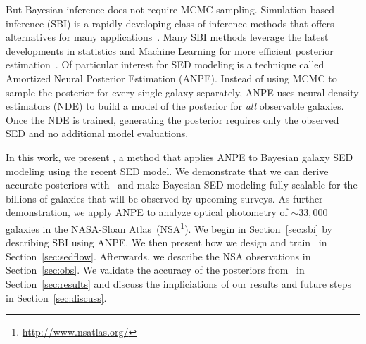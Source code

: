 But Bayesian inference does not require MCMC sampling. 
Simulation-based inference (SBI)
is a rapidly developing class of inference methods that offers alternatives for
many applications~\citep[see][and references therein]{cranmer2020}.
Many SBI methods leverage the latest developments in statistics and Machine
Learning for more efficient posterior estimation~\citep{papamakarios2017,
alsing2019a, hahn2019c, dax2021, huppenkothen2021, zhang2021}. 
Of particular interest for SED modeling is a technique called Amortized
Neural Posterior Estimation (ANPE). 
Instead of using MCMC to sample the posterior for every single galaxy separately,
ANPE uses neural density estimators (NDE) to build a model of the posterior for 
\emph{all} observable galaxies.
Once the NDE is trained, generating the posterior requires only the observed SED and no additional model
evaluations.
%

In this work, we present \sedflow, a method that applies ANPE to Bayesian
galaxy SED modeling using the recent \cite{hahn2022} SED model. 
We demonstrate that we can derive accurate posteriors with \sedflow~and make
Bayesian SED modeling fully scalable for the billions of galaxies that will be
observed by upcoming surveys.
As further demonstration, we apply ANPE to analyze optical photometry of
${\sim}33,000$ galaxies in the NASA-Sloan
Atlas~(NSA\footnote{\url{http://www.nsatlas.org/}}). 
We begin in Section~\ref{sec:sbi} by describing SBI using ANPE.
We then present how we design and train \sedflow~in Section~\ref{sec:sedflow}.
Afterwards, we describe the NSA observations in Section~\ref{sec:obs}. 
We validate the accuracy of the posteriors from \sedflow~in
Section~\ref{sec:results} and discuss the impliciations of our results and
future steps in Section~\ref{sec:discuss}. 

